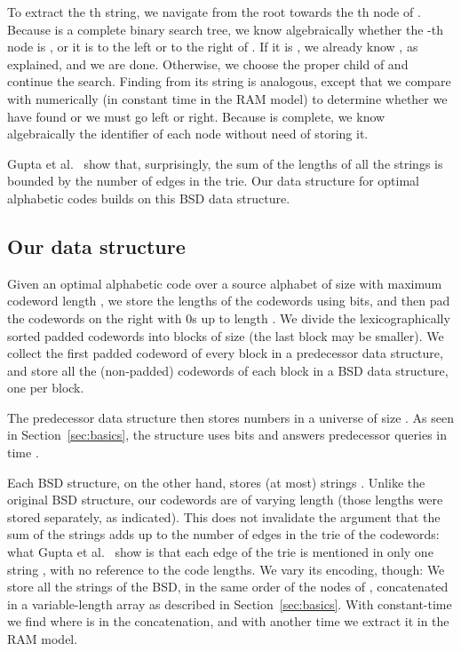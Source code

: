 \documentclass[preprint,12pt]{elsarticle}
\begin{document}
To extract the th string, we navigate from the root towards the th node
of . Because  is a complete binary search tree, we know algebraically 
whether the -th node is , or it is to the left or to the right of . 
If it is , we already know , as explained, and we are done. Otherwise, 
we choose the proper child  of  and continue the search.
Finding  from its string  is analogous, except that we compare  with
 numerically (in constant time in the RAM model) to determine whether we
have found  or we must go left or right. Because  is complete, we know
algebraically the identifier  of each node  without need of storing it.

Gupta et al.~\cite{GHSV07} show that, surprisingly, the sum of the lengths of 
all the strings  is bounded by the number of edges in the trie.
Our data structure for optimal alphabetic codes builds on this BSD data 
structure.

\subsection{Our data structure}

Given an optimal alphabetic code over a source alphabet of size  with 
maximum codeword length , we store the lengths of the  codewords 
using  bits, and then pad the codewords on the right
with 0s
up to length .  We divide the lexicographically sorted padded codewords into
blocks of size  (the last block may be smaller). We collect the first padded
codeword of every block in a predecessor data structure, and store all the 
(non-padded) codewords of each block in a BSD data structure, one per block.

The predecessor data structure then stores  numbers
in a universe of size . As seen in Section~\ref{sec:basics}, the structure
uses  bits and
answers predecessor queries in time .

Each BSD structure, on the other hand, stores (at most)  strings .
Unlike the original BSD structure, our codewords are of varying length
(those lengths were stored separately, as indicated). This does not invalidate
the argument that the sum of the strings  adds up to the number of edges in
the trie of the  codewords: what Gupta et al.~\cite[Lem.~3]{GHSV07} show
is that each edge of the trie is mentioned in only one string , with no
reference to the code lengths. 
We vary its encoding, though: We store all the strings  of the BSD, 
in the same order of the nodes of , concatenated in a variable-length array 
as described in Section~\ref{sec:basics}. With constant-time  we find 
where is  in the concatenation, and with another  time we extract
it in the RAM model. 
\end{document}
